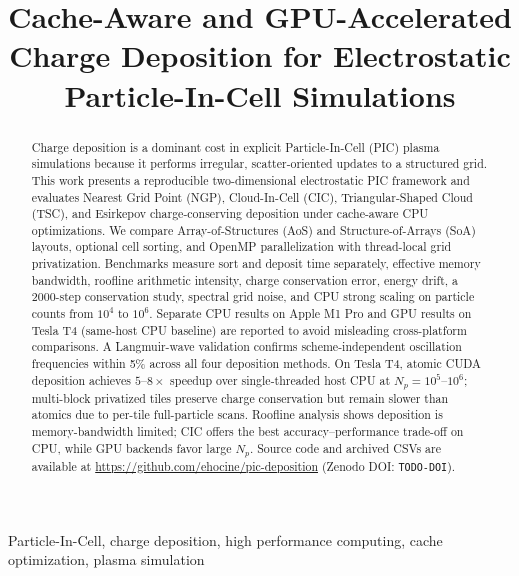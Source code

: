 \documentclass[conference]{IEEEtran}
\begin{document}
\title{Cache-Aware and GPU-Accelerated Charge Deposition for Electrostatic Particle-In-Cell Simulations}

\author{
}

\maketitle

\begin{abstract}
Charge deposition is a dominant cost in explicit Particle-In-Cell (PIC) plasma simulations because it performs irregular, scatter-oriented updates to a structured grid.
This work presents a reproducible two-dimensional electrostatic PIC framework and evaluates Nearest Grid Point (NGP), Cloud-In-Cell (CIC), Triangular-Shaped Cloud (TSC), and Esirkepov charge-conserving deposition under cache-aware CPU optimizations.
We compare Array-of-Structures (AoS) and Structure-of-Arrays (SoA) layouts, optional cell sorting, and OpenMP parallelization with thread-local grid privatization.
Benchmarks measure sort and deposit time separately, effective memory bandwidth, roofline arithmetic intensity, charge conservation error, energy drift, a 2000-step conservation study, spectral grid noise, and CPU strong scaling on particle counts from $10^4$ to $10^6$.
Separate CPU results on Apple M1 Pro and GPU results on Tesla T4 (same-host CPU baseline) are reported to avoid misleading cross-platform comparisons.
A Langmuir-wave validation confirms scheme-independent oscillation frequencies within 5\% across all four deposition methods.
On Tesla T4, atomic CUDA deposition achieves $5$--$8\times$ speedup over single-threaded host CPU at $N_p=10^5$--$10^6$; multi-block privatized tiles preserve charge conservation but remain slower than atomics due to per-tile full-particle scans.
Roofline analysis shows deposition is memory-bandwidth limited; CIC offers the best accuracy--performance trade-off on CPU, while GPU backends favor large $N_p$.
Source code and archived CSVs are available at \url{https://github.com/ehocine/pic-deposition} (Zenodo DOI: \texttt{TODO-DOI}).
\end{abstract}

\begin{IEEEkeywords}
Particle-In-Cell, charge deposition, high performance computing, cache optimization, plasma simulation
\end{IEEEkeywords}













\end{document}
